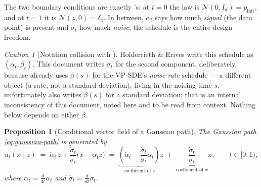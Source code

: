 \documentclass[11pt,a4paper]{report}
\newtheorem{proposition}[proposition]{Proposition}
\theoremstyle{definition}
\theoremstyle{remark}
\newtheorem{caution}[caution]{Caution}
\begin{document}
The two boundary conditions are exactly 's: at
$t=0$ the law is $\mathcal N(0,I_d)=p_{\mathrm{init}}$, and at $t=1$ it is
$\mathcal N(z,0)=\delta_z$. In between, $\alpha_t$ says how much
\emph{signal} (the data point) is present and $\sigma_t$ how much
\emph{noise}; the schedule is the entire design freedom.

\begin{caution}[Notation collision with ]
\label{caution:sigma-beta-collision}
Holderrieth \& Erives write this schedule as $(\alpha_t,\beta_t)$. This
document writes $\sigma_t$ for the second component, deliberately, because
 already uses $\beta(s)$ for the VP-SDE's \emph{noise-rate}
schedule --- a different object (a rate, not a standard deviation), living
in the noising time $s$.  unfortunately also
writes $\beta(s)$ for a standard deviation; that is an internal
inconsistency of this document, noted here and to be read from context.
Nothing below depends on either $\beta$.
\end{caution}

\begin{proposition}[Conditional vector field of a Gaussian path]
\label{prop:gaussian-cvf}
The Gaussian path \eqref{eq:gaussian-path} is generated by
\begin{equation}
\label{eq:gaussian-cvf}
u_t(x\mid z)
\;=\;
\dot\alpha_t\,z + \frac{\dot\sigma_t}{\sigma_t}\bigl(x-\alpha_tz\bigr)
\;=\;
\underbrace{\left(\dot\alpha_t-\frac{\dot\sigma_t}{\sigma_t}\alpha_t\right)}_{\text{coefficient of }z}z
\;+\;
\underbrace{\frac{\dot\sigma_t}{\sigma_t}}_{\text{coefficient of }x}x ,
\qquad t\in[0,1),
\end{equation}
where $\dot\alpha_t = \tfrac{d}{dt}\alpha_t$ and
$\dot\sigma_t=\tfrac{d}{dt}\sigma_t$.
\end{proposition}
\end{document}
